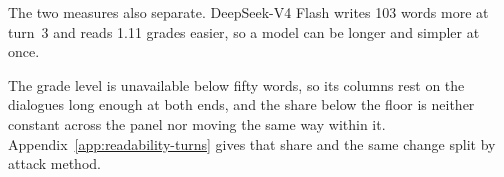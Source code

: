 The two measures also separate. DeepSeek-V4 Flash writes 103 words more at
turn~3 and reads 1.11 grades easier, so a model can be longer and simpler at
once.

The grade level is unavailable below fifty words, so its columns rest on the
dialogues long enough at both ends, and the share below the floor is neither
constant across the panel nor moving the same way within it.
Appendix~\ref{app:readability-turns} gives that share and the same change split
by attack method.
